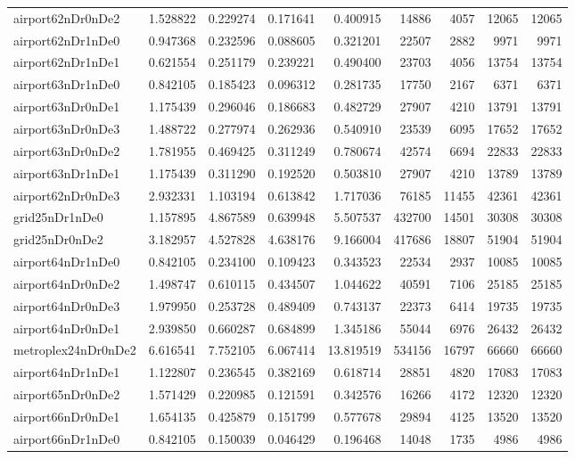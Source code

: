 \begin{longtable}{|l|r|r|r|r|r|r|r|r|}
airport62nDr0nDe2 & 1.528822 & 0.229274 & 0.171641 & 0.400915 & 14886 & 4057 & 12065 & 12065 \\
airport62nDr1nDe0 & 0.947368 & 0.232596 & 0.088605 & 0.321201 & 22507 & 2882 & 9971 & 9971 \\
airport62nDr1nDe1 & 0.621554 & 0.251179 & 0.239221 & 0.490400 & 23703 & 4056 & 13754 & 13754 \\
airport63nDr1nDe0 & 0.842105 & 0.185423 & 0.096312 & 0.281735 & 17750 & 2167 & 6371 & 6371 \\
airport63nDr0nDe1 & 1.175439 & 0.296046 & 0.186683 & 0.482729 & 27907 & 4210 & 13791 & 13791 \\
airport63nDr0nDe3 & 1.488722 & 0.277974 & 0.262936 & 0.540910 & 23539 & 6095 & 17652 & 17652 \\
airport63nDr0nDe2 & 1.781955 & 0.469425 & 0.311249 & 0.780674 & 42574 & 6694 & 22833 & 22833 \\
airport63nDr1nDe1 & 1.175439 & 0.311290 & 0.192520 & 0.503810 & 27907 & 4210 & 13789 & 13789 \\
airport62nDr0nDe3 & 2.932331 & 1.103194 & 0.613842 & 1.717036 & 76185 & 11455 & 42361 & 42361 \\
grid25nDr1nDe0 & 1.157895 & 4.867589 & 0.639948 & 5.507537 & 432700 & 14501 & 30308 & 30308 \\
grid25nDr0nDe2 & 3.182957 & 4.527828 & 4.638176 & 9.166004 & 417686 & 18807 & 51904 & 51904 \\
airport64nDr1nDe0 & 0.842105 & 0.234100 & 0.109423 & 0.343523 & 22534 & 2937 & 10085 & 10085 \\
airport64nDr0nDe2 & 1.498747 & 0.610115 & 0.434507 & 1.044622 & 40591 & 7106 & 25185 & 25185 \\
airport64nDr0nDe3 & 1.979950 & 0.253728 & 0.489409 & 0.743137 & 22373 & 6414 & 19735 & 19735 \\
airport64nDr0nDe1 & 2.939850 & 0.660287 & 0.684899 & 1.345186 & 55044 & 6976 & 26432 & 26432 \\
metroplex24nDr0nDe2 & 6.616541 & 7.752105 & 6.067414 & 13.819519 & 534156 & 16797 & 66660 & 66660 \\
airport64nDr1nDe1 & 1.122807 & 0.236545 & 0.382169 & 0.618714 & 28851 & 4820 & 17083 & 17083 \\
airport65nDr0nDe2 & 1.571429 & 0.220985 & 0.121591 & 0.342576 & 16266 & 4172 & 12320 & 12320 \\
airport66nDr0nDe1 & 1.654135 & 0.425879 & 0.151799 & 0.577678 & 29894 & 4125 & 13520 & 13520 \\
airport66nDr1nDe0 & 0.842105 & 0.150039 & 0.046429 & 0.196468 & 14048 & 1735 & 4986 & 4986 \\

\end{longtable}
